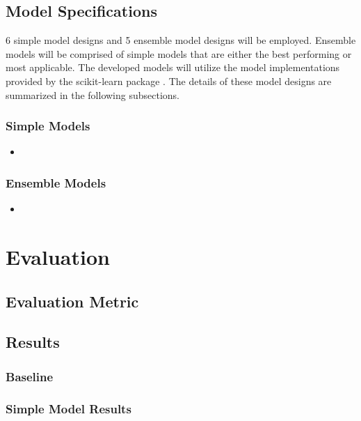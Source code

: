 \documentclass[10pt,sigconf,letterpaper,nonacm]{acmart}
\begin{document}
\subsection{Model Specifications}

6 simple model designs and 5 ensemble model designs will be employed.
Ensemble models will be comprised of simple models that are either the best performing or most applicable.
The developed models will utilize the model implementations provided by the scikit-learn package \cite{scikit-learn}.
The details of these model designs are summarized in the following subsections.

\subsubsection{Simple Models}

\begin{itemize}
  \item \textbf{}
\end{itemize}

\subsubsection{Ensemble Models}

\begin{itemize}
  \item \textbf{}
\end{itemize}

\section{Evaluation}

\subsection{Evaluation Metric}

\subsection{Results}

\subsubsection{Baseline}

\subsubsection{Simple Model Results}
\end{document}
